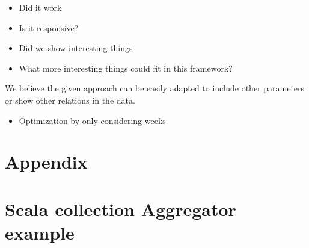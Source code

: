 \documentclass[10pt,a4paper]{article}
\renewcommand\appendix{\par
\setcounter{section}{0}%
\setcounter{subsection}{0}%
\setcounter{table}{0}
\setcounter{figure}{0}
\setcounter{equation}{0}
\gdef\thetable{\Alph{table}}
\gdef\thefigure{\Alph{figure}}
\gdef\theequation{\Alph{section}-\arabic{equation}}
\section*{Appendix}
\gdef\thesection{\Alph{section}}
\setcounter{section}{0}}
\begin{document}
\begin{itemize}
    \item Did it work
    \item Is it responsive?
    \item Did we show interesting things
    \item What more interesting things could fit in this framework?
\end{itemize}

We believe the given approach can be easily adapted to include other parameters or show other relations in the data.

\begin{itemize}
    \item Optimization by only considering weeks
\end{itemize}




\appendix

\section{Scala collection Aggregator example}
\end{document}
